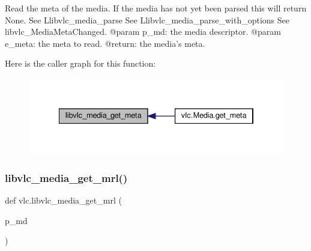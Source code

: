 \begin{DoxyVerb}Read the meta of the media.
If the media has not yet been parsed this will return None.
See L{libvlc_media_parse}
See L{libvlc_media_parse_with_options}
See libvlc_MediaMetaChanged.
@param p_md: the media descriptor.
@param e_meta: the meta to read.
@return: the media's meta.
\end{DoxyVerb}
 Here is the caller graph for this function\+:
\nopagebreak
\begin{figure}[H]
\begin{center}
\leavevmode
\includegraphics[width=334pt]{namespacevlc_a6c1e8a08c9abed8c2f421cd6a2036990_icgraph}
\end{center}
\end{figure}
\mbox{\label{namespacevlc_aafa8b7a81c78b84c54b79a80aa1fc63f}} 
\subsubsection{\texorpdfstring{libvlc\+\_\+media\+\_\+get\+\_\+mrl()}{libvlc\_media\_get\_mrl()}}
{\footnotesize\ttfamily def vlc.\+libvlc\+\_\+media\+\_\+get\+\_\+mrl (\begin{DoxyParamCaption}\item[{}]{p\+\_\+md }\end{DoxyParamCaption})}

